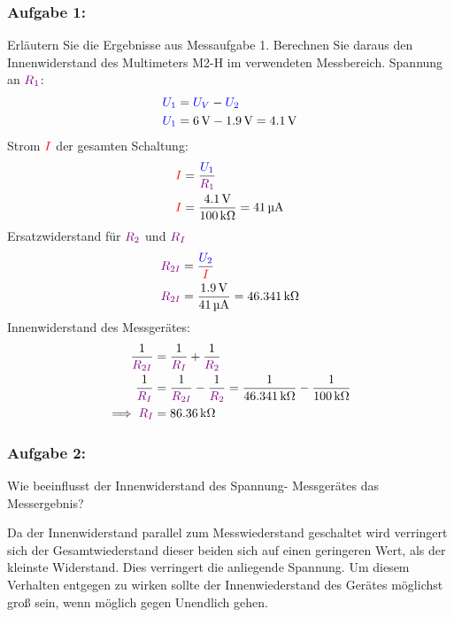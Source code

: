 \documentclass[a4paper,titlepage,parskip]{scrreprt}
\newcommand{\spannung}[1]{\textcolor{blue}{#1}}
\newcommand{\strom}[1]{\textcolor{red}{#1}}
\newcommand{\widerstand}[1]{\textcolor{violet}{#1}}
\begin{document}
            \subsubsection{Aufgabe 1:}  Erläutern Sie die Ergebnisse aus Messaufgabe 1. Berechnen Sie daraus den Innenwiderstand des Multimeters M2-H im verwendeten Messbereich.
                Spannung an $\widerstand{R_1}$:
                \begin{align*}
                    \spannung{U_1} &= \spannung{U_V} - \spannung{U_2}\\
                    \spannung{U_1} &= \SI{6}{\volt} - \SI{1,9}{\volt} = \SI{4,1}{\volt}
                \end{align*}
                Strom $\strom{I}$ der gesamten Schaltung:
                \begin{align*}
                    \strom{I} &= \frac{\spannung{U_1}}{\widerstand{R_1}}\\
                    \strom{I} &= \frac{\SI{4,1}{\volt}}{\SI{100}{\kilo\ohm}} = \SI{41}{\micro\ampere}                    
                \end{align*}
                Ersatzwiderstand für $\widerstand{R_2}$ und $\widerstand{R_I}$
                \begin{align*}
                    \widerstand{R_{2I}} &= \frac{\spannung{U_2}}{\strom{I}}\\
                    \widerstand{R_{2I}} &= \frac{\SI{1,9}{\volt}}{\SI{41}{\micro\ampere}} = \SI{46,341}{\kilo\ohm}
                \end{align*}
                Innenwiderstand des Messgerätes:
                \begin{align*}
                    \frac{1}{\widerstand{R_{2I}}} &= \frac{1}{\widerstand{R_I}} + \frac{1}{\widerstand{R_2}}\\
                    \frac{1}{\widerstand{R_I}} &= \frac{1}{\widerstand{R_{2I}}} - \frac{1}{\widerstand{R_2}} = \frac{1}{\SI{46,341}{\kilo\ohm}} - \frac{1}{\SI{100}{\kilo\ohm}}\\
                    \implies \widerstand{R_I} &= \SI{86,36}{\kilo\ohm} 
                \end{align*}
            \subsubsection{Aufgabe 2:}  Wie beeinflusst der Innenwiderstand des Spannung- Messgerätes das Messergebnis?
            
                Da der Innenwiderstand parallel zum Messwiederstand geschaltet wird verringert sich der Gesamtwiederstand dieser beiden sich auf einen geringeren Wert, als der kleinste Widerstand. Dies verringert die anliegende Spannung. Um diesem Verhalten entgegen zu wirken sollte der Innenwiederstand des Gerätes möglichst groß sein, wenn möglich gegen Unendlich gehen.
                
\end{document}
